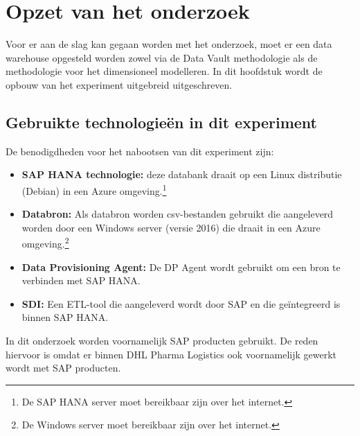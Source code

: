 
\chapter{Opzet van het onderzoek}
\label{ch:voorbereidingonderzoek}

Voor er aan de slag kan gegaan worden met het onderzoek, moet er een data warehouse opgesteld worden zowel via de Data Vault methodologie als de methodologie voor het dimensioneel modelleren. In dit hoofdstuk wordt de opbouw van het experiment uitgebreid uitgeschreven.

\section{Gebruikte technologieën in dit experiment}
De benodigdheden voor het nabootsen van dit experiment zijn:

\begin{itemize}
	\item \textbf{SAP HANA technologie:} deze databank draait op een Linux distributie (Debian) in een Azure omgeving.\footnote[1]{De SAP HANA server moet bereikbaar zijn over het internet.}
	\item \textbf{Databron:} Als databron worden csv-bestanden gebruikt die aangeleverd worden door een Windows server (versie 2016) die draait in een Azure omgeving.\footnote[2]{De Windows server moet bereikbaar zijn over het internet.}
	\item \textbf{Data Provisioning Agent:} De DP Agent wordt gebruikt om een bron te verbinden met SAP HANA.
	\item \textbf{SDI:} Een ETL-tool die aangeleverd wordt door SAP en die geïntegreerd is binnen SAP HANA.
\end{itemize}

In dit onderzoek worden voornamelijk SAP producten gebruikt. De reden hiervoor is omdat er binnen DHL Pharma Logistics ook voornamelijk gewerkt wordt met SAP producten.

